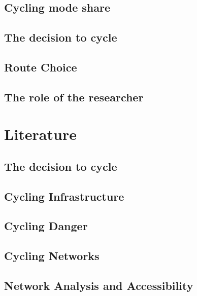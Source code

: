 \documentclass[11pt]{article} %
\begin{document}
\subsection{Cycling mode share}



\subsection{The decision to cycle}



\subsection{Route Choice}



\subsection{The role of the researcher}



\section{Literature}

\subsection{The decision to cycle}

\subsection{Cycling Infrastructure}

\subsection{Cycling Danger}

\subsection{Cycling Networks}

\subsection{Network Analysis and Accessibility}
\end{document}
